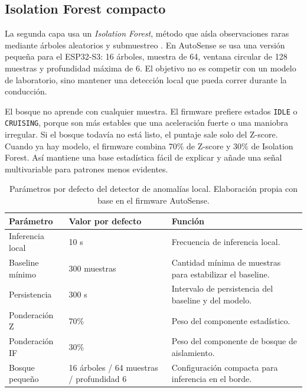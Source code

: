 \documentclass[12pt,letterpaper]{report}
\begin{document}
\subsection{Isolation Forest compacto}

La segunda capa usa un \textit{Isolation Forest}, método que aísla observaciones raras mediante árboles aleatorios y submuestreo \cite{liu2008_isolation_forest}. En AutoSense se usa una versión pequeña para el ESP32-S3: 16 árboles, muestra de 64, ventana circular de 128 muestras y profundidad máxima de 6. El objetivo no es competir con un modelo de laboratorio, sino mantener una detección local que pueda correr durante la conducción.

El bosque no aprende con cualquier muestra. El firmware prefiere estados \texttt{IDLE} o \texttt{CRUISING}, porque son más estables que una aceleración fuerte o una maniobra irregular. Si el bosque todavía no está listo, el puntaje sale solo del Z-score. Cuando ya hay modelo, el firmware combina 70\% de Z-score y 30\% de Isolation Forest. Así mantiene una base estadística fácil de explicar y añade una señal multivariable para patrones menos evidentes.

\begin{table}[!htbp]
    \centering
    \caption{Parámetros por defecto del detector de anomalías local. Elaboración propia con base en el firmware AutoSense.}
    \label{tab:ai-anomaly-defaults}
    \renewcommand{\arraystretch}{1.08}
    \setlength{\tabcolsep}{4pt}
    \begin{tabular}{p{}p{}p{}}
    \toprule
    Parámetro & Valor por defecto & Función \\
    \midrule
    Inferencia local & 10 s & Frecuencia de inferencia local. \\
    Baseline mínimo & 300 muestras & Cantidad mínima de muestras para estabilizar el baseline. \\
    Persistencia & 300 s & Intervalo de persistencia del baseline y del modelo. \\
    Ponderación Z & 70\% & Peso del componente estadístico. \\
    Ponderación IF & 30\% & Peso del componente de bosque de aislamiento. \\
    Bosque pequeño & 16 árboles / 64 muestras / profundidad 6 & Configuración compacta para inferencia en el borde. \\
    \bottomrule
    \end{tabular}
\end{table}
\end{document}

